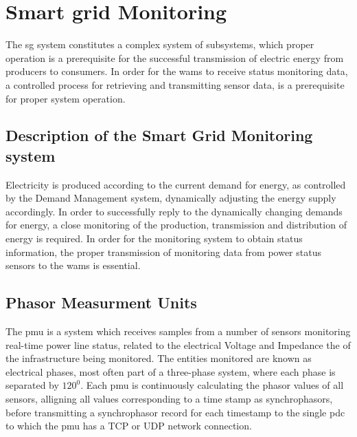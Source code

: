 \section{Smart grid Monitoring}
The \acrlong{sg} system constitutes a complex system of subsystems, which proper operation is a prerequisite for the successful transmission of electric energy from producers to consumers. 
In order for the \acrshort{wams} to receive status monitoring data, a controlled process for retrieving and transmitting sensor data, is a prerequisite for proper system operation.



\subsection{Description of the Smart Grid  Monitoring system}
Electricity is produced according to the current demand for energy, as controlled by the Demand Management system, dynamically adjusting the energy supply accordingly. In order to successfully reply to the dynamically changing demands for energy, a close monitoring of the production, transmission and distribution of energy is required. In order for the monitoring system to obtain status information, the proper transmission of monitoring data from power status sensors to the   \acrshort{wams}  is essential.



\subsection{Phasor Measurment Units}
The \acrfull{pmu} is a system which receives samples from a number of sensors monitoring  real-time power line status, related to the electrical Voltage and Impedance the of the infrastructure being monitored. 
The entities monitored are known as electrical phases, most often part of a three-phase system, where each phase is separated by $120^0$.
Each \acrshort{pmu} is continuously calculating the phasor values of all sensors, alligning all values corresponding to a time stamp as synchrophasors, before transmitting a synchrophasor record for each timestamp to the single \acrfull{pdc} to which the \acrshort{pmu} has a  TCP or UDP network connection.




